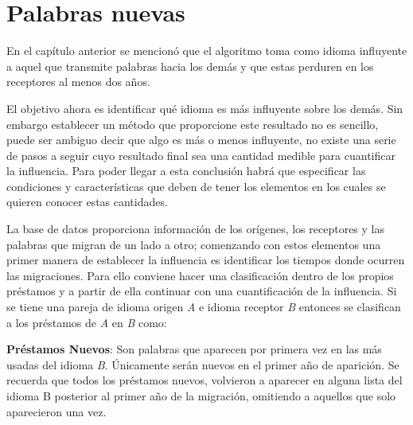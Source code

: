 \chapter{Palabras nuevas}
En el capítulo anterior se mencionó que el algoritmo toma como  idioma
influyente a aquel que transmite palabras hacia los demás y que estas perduren
en los receptores al menos dos años.

El objetivo ahora es identificar qué idioma es más influyente sobre los demás. Sin embargo establecer un método que proporcione este resultado no es sencillo, puede ser ambiguo decir que algo es más o menos influyente, no existe una serie de pasos a seguir cuyo resultado final sea una cantidad medible para cuantificar la influencia.  Para poder llegar a esta conclusión habrá que
especificar las condiciones y características que deben de tener los elementos en los cuales se quieren conocer estas cantidades.
 

La base de datos proporciona información de los orígenes, los receptores y las palabras que migran de un lado a otro; comenzando con estos elementos una primer manera de establecer la influencia es  identificar los tiempos donde ocurren las migraciones.  Para ello conviene hacer una clasificación dentro de los propios préstamos y a partir de ella  continuar con una cuantificación de la influencia.  Si se tiene una pareja de idioma origen \textit{A} e idioma receptor \textit{B} entonces se clasifican a los préstamos de \textit{A} en \textit{B} como:

\textbf{Préstamos Nuevos}: Son palabras que aparecen por primera vez en las más
usadas del idioma \textit{B}.  Únicamente serán nuevos en el primer año de
aparición.  Se recuerda que todos los préstamos nuevos, volvieron a aparecer en
alguna lista del idioma B posterior al primer año de la migración, omitiendo a
aquellos que solo aparecieron una vez. 

